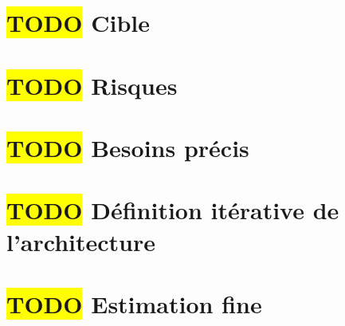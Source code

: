 \section{\colorbox{yellow}{TODO} Cible}

\section{\colorbox{yellow}{TODO} Risques}

\section{\colorbox{yellow}{TODO} Besoins précis}

\section{\colorbox{yellow}{TODO} Définition itérative de l'architecture}

\section{\colorbox{yellow}{TODO} Estimation fine}

